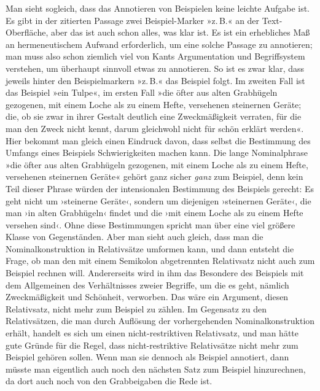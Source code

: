 \documentclass{article}
\begin{document}
Man sieht sogleich, dass das Annotieren von Beispielen keine leichte
Aufgabe ist. Es gibt in der zitierten Passage zwei Beispiel-Marker
»z.\,B.« an der Text-Oberfläche, aber das ist auch schon alles, was
klar ist. Es ist ein erhebliches Maß an hermeneutischem Aufwand
erforderlich, um eine solche Passage zu annotieren; man muss also
schon ziemlich viel von Kants Argumentation und Begriffsystem
verstehen, um überhaupt sinnvoll etwas zu annotieren. So ist es zwar
klar, dass jeweils hinter den Beispielmarkern »z.\,B.« das Beispiel
folgt. Im zweiten Fall ist das Beispiel »ein Tulpe«, im ersten Fall
»die öfter aus alten Grabhügeln gezogenen, mit einem Loche als zu
einem Hefte, versehenen steinernen Geräte; die, ob sie zwar in ihrer
Gestalt deutlich eine Zweckmäßigkeit verraten, für die man den Zweck
nicht kennt, darum gleichwohl nicht für schön erklärt werden«. Hier
bekommt man gleich einen Eindruck davon, dass selbst die Bestimmung
des Umfangs eines Beispiels Schwierigkeiten machen kann. Die lange
Nominalphrase »die öfter aus alten Grabhügeln gezogenen, mit einem
Loche als zu einem Hefte, versehenen steinernen Geräte« gehört ganz
sicher \emph{ganz} zum Beispiel, denn kein Teil dieser Phrase würden
der intensionalen Bestimmung des Beispiels gerecht: Es geht nicht um
›steinerne Geräte‹, sondern um diejenigen ›steinernen Geräte‹, die man
›in alten Grabhügeln‹ findet und die ›mit einem Loche als zu einem
Hefte versehen sind‹. Ohne diese Bestimmungen spricht man über eine
viel größere Klasse von Gegenständen. Aber man sieht auch gleich, dass
man die Nominalkonstruktion in Relativsätze umformen kann, und dann
entsteht die Frage, ob man den mit einem Semikolon abgetrennten
Relativsatz nicht auch zum Beispiel rechnen will. Andererseits wird in
ihm das Besondere des Beispiels mit dem Allgemeinen des Verhältnisses
zweier Begriffe, um die es geht, nämlich Zweckmäßigkeit und Schönheit,
verworben. Das wäre ein Argument, diesen Relativsatz, nicht mehr zum
Beispiel zu zählen. Im Gegensatz zu den Relativsätzen, die man durch
Auflösung der vorhergehenden Nominalkonstruktion erhält, handelt es
sich um einen nicht-restriktiven Relativsatz, und man hätte gute
Gründe für die Regel, dass nicht-restriktive Relativsätze nicht mehr
zum Beispiel gehören sollen. Wenn man sie dennoch als Beispiel
annotiert, dann müsste man eigentlich auch noch den nächsten Satz zum
Beispiel hinzurechnen, da dort auch noch von den Grabbeigaben die Rede
ist.
\end{document}
